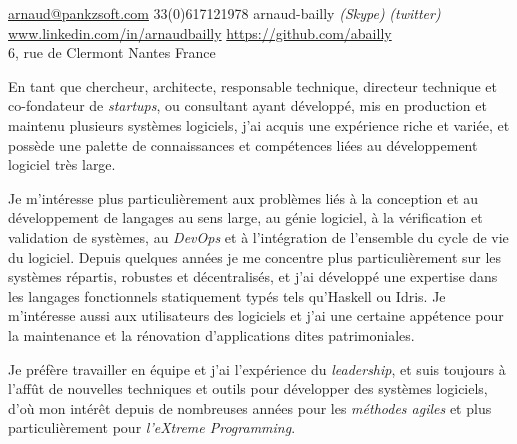 \documentclass[12pt,a4paper]{article}
\begin{document}
\sloppy


\noindent\href{mailto:arnaud.at.pankzsoft.dot.com}{arnaud\mbox{}@\mbox{}pankzsoft.com}\sbull
\textsmaller{+}33(0)617121978\sbull
{\newnums arnaud-bailly} \emph{(Skype)} \emph{(twitter)}\sbull
\href{http://www.linkedin.com/in/arnaudbailly}{www.linkedin.com/in/arnaudbailly} \sbull
\href{https://github.com/abailly}{https://github.com/abailly} \\
6, rue de Clermont Nantes\sbull
France

\spacedhrule{0.9em}{-0.4em}  %


\begin{multicols}{2}  %
  En tant que chercheur, architecte, responsable technique, directeur technique et co-fondateur de \emph{startups}, ou consultant ayant développé, mis en production et maintenu plusieurs systèmes logiciels, j'ai acquis une expérience riche et variée, et possède une palette de connaissances et compétences liées au développement logiciel très large.

  Je m'intéresse plus particulièrement aux problèmes liés à la conception et au développement de langages au sens large, au génie logiciel, à la vérification et validation de systèmes, au \emph{DevOps} et à l'intégration de l'ensemble du cycle de vie du logiciel. Depuis quelques années je me concentre plus particulièrement sur les systèmes répartis, robustes et décentralisés, et j'ai développé une expertise dans les langages fonctionnels statiquement typés tels qu'Haskell ou Idris. Je m'intéresse aussi aux utilisateurs des logiciels et j'ai une certaine appétence pour la maintenance et la rénovation d'applications dites patrimoniales.

  Je préfère travailler en équipe et j'ai l'expérience du \emph{leadership}, et suis toujours à l'affût de nouvelles techniques et outils pour développer des systèmes logiciels, d'où mon intérêt depuis de nombreuses années pour les \emph{méthodes agiles} et plus particulièrement pour \emph{l'eXtreme Programming}.
\end{multicols}

\end{document}
